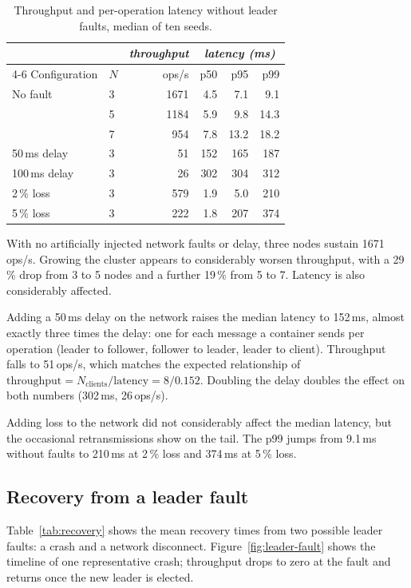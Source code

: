 \documentclass[conference]{IEEEtran}
\begin{document}
\begin{table}[h]
\centering
\small
\setlength{\tabcolsep}{4pt}
\caption{Throughput and per-operation latency without leader faults, median of ten seeds.}\label{tab:perf}
\begin{tabular}{@{}llr@{\hspace{12pt}}rrr@{}}
\toprule
 & & \emph{throughput} & \multicolumn{3}{c}{\emph{latency (ms)}} \\
\cmidrule(l){4-6}
Configuration & $N$ & ops/s & p50 & p95 & p99 \\
\midrule
No fault & 3 & 1671 & 4.5 & 7.1 & 9.1 \\
         & 5 & 1184 & 5.9 & 9.8 & 14.3 \\
         & 7 & 954 & 7.8 & 13.2 & 18.2 \\
50\,ms delay & 3 & 51 & 152 & 165 & 187 \\
100\,ms delay & 3 & 26 & 302 & 304 & 312 \\
2\,\% loss & 3 & 579 & 1.9 & 5.0 & 210 \\
5\,\% loss & 3 & 222 & 1.8 & 207 & 374 \\
\bottomrule
\end{tabular}
\end{table}

With no artificially injected network faults or delay, three nodes sustain 1671 ops/s. Growing the cluster appears to considerably worsen throughput,
with a 29\,\% drop from 3 to 5 nodes and a further 19\,\% from 5 to 7. Latency is also considerably affected.

Adding a 50\,ms delay on the network raises the median latency to 152\,ms, almost exactly three times the delay: one for each message a container sends per operation
(leader to follower, follower to leader, leader to client). Throughput falls to 51\,ops/s,
which matches the expected relationship of $\text{throughput} = N_\text{clients} / \text{latency} =8/0.152$. Doubling the delay doubles the effect on both numbers (302\,ms, 26\,ops/s).

Adding loss to the network did not considerably affect the median latency, but the occasional retransmissions show on the tail.
The p99 jumps from 9.1\,ms without faults to 210\,ms at 2\,\% loss and 374\,ms at 5\,\% loss.

\subsection{Recovery from a leader fault}

Table~\ref{tab:recovery} shows the mean recovery times from two possible leader faults: a crash and a network disconnect. Figure~\ref{fig:leader-fault} shows the timeline of one representative crash; throughput drops to zero at the fault and returns once the new leader is elected.
\end{document}
